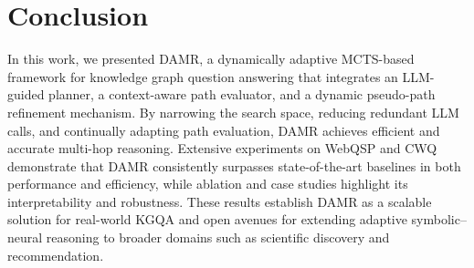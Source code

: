 \section{Conclusion}

In this work, we presented DAMR, a dynamically adaptive MCTS-based framework for knowledge graph question answering that integrates an LLM-guided planner, a context-aware path evaluator, and a dynamic pseudo-path refinement mechanism. By narrowing the search space, reducing redundant LLM calls, and continually adapting path evaluation, DAMR achieves efficient and accurate multi-hop reasoning. Extensive experiments on WebQSP and CWQ demonstrate that DAMR consistently surpasses state-of-the-art baselines in both performance and efficiency, while ablation and case studies highlight its interpretability and robustness. These results establish DAMR as a scalable solution for real-world KGQA and open avenues for extending adaptive symbolic–neural reasoning to broader domains such as scientific discovery and recommendation.

